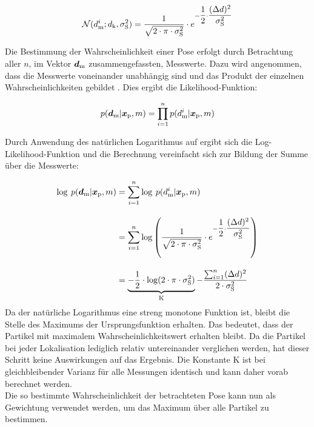 \begin{equation}
\mathcal{N}(d_{{\mathrm{m}}}^i;d_{{\mathrm{k}}},\sigma_{{\mathrm{S}}}^2) = \frac{1}{\sqrt{2 \cdot \pi \cdot \sigma_{{\mathrm{S}}}^2}}  \cdot e^{-\dfrac{1}{2} \cdot \dfrac{{(\Delta d})^2}{\sigma_{{\mathrm{S}}}^2}}
\end{equation}

Die Bestimmung der Wahrscheinlichkeit einer Pose erfolgt durch Betrachtung aller $n$, im Vektor $\mbox{\boldmath{$d$}}_{{\mathrm{m}}}$ zusammengefassten, Messwerte. Dazu wird angenommen, dass die Messwerte voneinander unabhängig sind und das Produkt der einzelnen Wahrscheinlichkeiten gebildet \cite{Hornung2010}. Dies ergibt die Likelihood-Funktion:

\begin{equation}
\label{eq.likelihood}
p(\mbox{\boldmath{$d$}}_{{\mathrm{m}}}|\mbox{\boldmath{$x$}}_{{\mathrm{p}}},m) = \prod_{i=1}^{n}p(d_{{\mathrm{m}}}^i|\mbox{\boldmath{$x$}}_{{\mathrm{p}}},m)
\end{equation}

Durch Anwendung des natürlichen Logarithmus auf  ergibt sich die Log-Likelihood-Funktion und die Berechnung vereinfacht sich zur Bildung der Summe über die Messwerte:

\begin{equation}
\begin{split}
\log \: p(\mbox{\boldmath{$d$}}_{{\mathrm{m}}}|\mbox{\boldmath{$x$}}_{{\mathrm{p}}},m) & = \sum_{i=1}^{n}\log\: p(d_{{\mathrm{m}}}^i|\mbox{\boldmath{$x$}}_{{\mathrm{p}}},m) \\[1em]
& = \sum_{i=1}^{n}\log \left( \frac{1}{\sqrt{2 \cdot \pi \cdot \sigma_{{\mathrm{S}}}^2}} \cdot e^{-\dfrac{1}{2} \cdot \dfrac{{(\Delta d})^2}{\sigma_{{\mathrm{S}}}^2}} \right)\\[1em]
& = \underbrace{-\frac{1}{2} \cdot \log(2 \cdot \pi \cdot\sigma_{{\mathrm{S}}}^2)}_{{\mathrm{K}}}-\dfrac{\sum_{i=1}^{n}(\Delta d)^2}{2 \cdot \sigma_{{\mathrm{S}}}^2}
\end{split}
\end{equation}
Da der natürliche Logarithmus eine streng monotone Funktion ist, bleibt die Stelle des Maximums der Ursprungsfunktion erhalten. Das bedeutet, dass der Partikel mit maximalem Wahrscheinlichkeitswert erhalten bleibt. Da die Partikel bei jeder Lokalisation lediglich relativ untereinander verglichen werden, hat dieser Schritt keine Auswirkungen auf das Ergebnis. Die Konstante $\mathrm{K}$ ist bei gleichbleibender Varianz für alle Messungen identisch und kann daher vorab berechnet werden.\\
Die so bestimmte Wahrscheinlichkeit der betrachteten Pose kann nun als Gewichtung verwendet werden, um das Maximum über alle Partikel zu bestimmen. 

